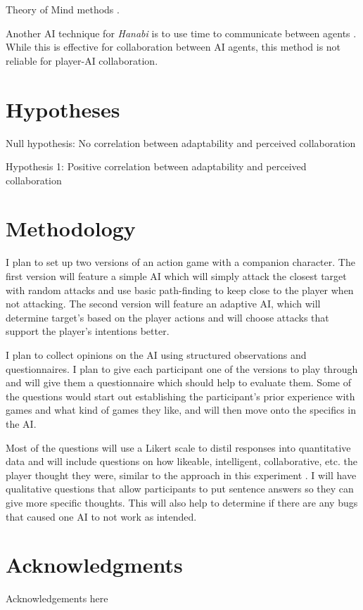 \documentclass{IEEEtran}
\begin{document}
Theory of Mind methods \cite{TheoryOfMind2013, von2017mindsofmany}.

Another AI technique for \textit{Hanabi} is to use time to communicate between agents \cite{WaitASecond2019}. While this is effective for collaboration between AI agents, this method is not reliable for player-AI collaboration.

\section{Hypotheses}
\label{Hypotheses}

Null hypothesis: No correlation between adaptability and perceived collaboration

Hypothesis 1: Positive correlation between adaptability and perceived collaboration
 
\section{Methodology}
\label{Method}

I plan to set up two versions of an action game with a companion character. The first version will feature a simple AI which will simply attack the closest target with random attacks and use basic path-finding to keep close to the player when not attacking. The second version will feature an adaptive AI, which will determine target's based on the player actions and will choose attacks that support the player's intentions better.

I plan to collect opinions on the AI using structured observations and questionnaires. I plan to give each participant one of the versions to play through and will give them a questionnaire which should help to evaluate them. Some of the questions would start out establishing the participant's prior experience with games and what kind of games they like, and will then move onto the specifics in the AI.

Most of the questions will use a Likert scale to distil responses into quantitative data and will include questions on how likeable, intelligent, collaborative, etc. the player thought they were, similar to the approach in this experiment \cite{SocialPerceptions2020}. I will have qualitative questions that allow participants to put sentence answers so they can give more specific thoughts. This will also help to determine if there are any bugs that caused one AI to not work as intended.
 
\section*{Acknowledgments}

Acknowledgements here


 
\end{document}
